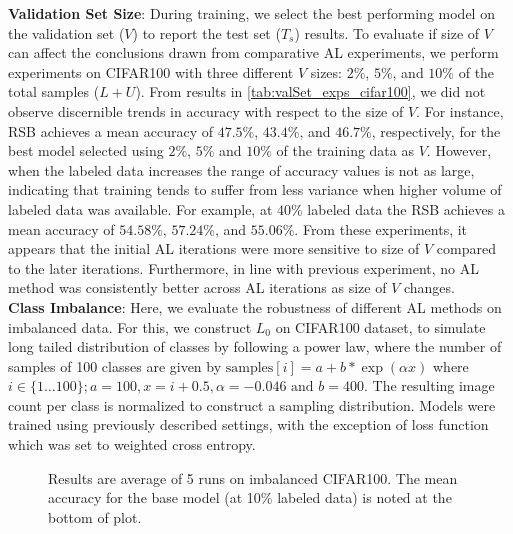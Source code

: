 \documentclass[10pt,twocolumn,letterpaper]{article}
\begin{document}
\noindent \textbf{Validation Set Size}: During training, we select the best performing model on the validation set ($V$) to report the test set ($T_s$) results. To evaluate if size of $V$ can affect the conclusions drawn from comparative AL experiments, we perform experiments on CIFAR100 with three different $V$ sizes: $2\%$, $5\%$, and $10\%$ of the total samples ($L+U$).
From results in \cref{tab:valSet_exps_cifar100}, we did not observe discernible trends in accuracy with respect to the size of $V$. For instance, RSB achieves a mean accuracy of $47.5\%$, $43.4\%$, and $46.7\%$, respectively, for the best model selected using $2\%$, $5\%$ and $10\%$ of the training data as $V$. However, when the labeled data increases the range of accuracy values is not as large, indicating that training tends to suffer from less variance when higher volume of labeled data was available. For example, at $40\%$ labeled data the RSB achieves a mean accuracy of $54.58\%$, $57.24\%$, and $55.06\%$.  From these experiments, it appears that the initial AL iterations were more sensitive to size of $V$ compared to the later iterations. Furthermore, in line with previous experiment, no AL method was consistently better across AL iterations as size of $V$ changes.\\
\noindent \textbf{Class Imbalance}: Here, we evaluate the robustness of different AL methods on imbalanced data. For this, we construct $L_{0}$ on CIFAR100 dataset, to simulate long tailed distribution of classes by following a power law, where the number of samples of 100 classes are given by $\text{samples}[i] = a + b*\exp({\alpha x})$ where $i\in\{1\dots 100\}; a = 100, x = i+0.5,  \alpha = -0.046\text{ and } b = 400$. The resulting image count per class is normalized to construct a sampling distribution. Models were trained using previously described settings, with the exception of loss function which was set to weighted cross entropy. 
\begin{figure}
\begin{center}
  \vspace{-2em}
\end{center}
    \caption{Results are average of 5 runs on imbalanced CIFAR100. The mean accuracy for the base model (at 10\% labeled data) is noted at the bottom of plot.}
    
\label{fig:class_imbalance_cif100_exp}
  \vspace{-1em}
\end{figure}
\end{document}
